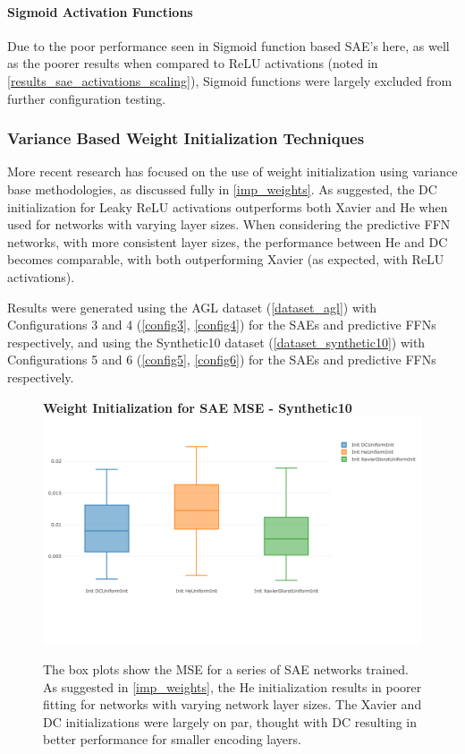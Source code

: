 \documentclass[a4paper,11pt,oneside]{article}
\theoremstyle{plain}
\theoremstyle{definition}
\begin{document}
\paragraph{Sigmoid Activation Functions} 
Due to the poor performance seen in Sigmoid function based SAE's here, as well as the poorer results when compared to ReLU activations (noted in \ref{results_sae_activations_scaling}), Sigmoid functions were largely excluded from further configuration testing.


\subsubsection{Variance Based Weight Initialization Techniques}

More recent research has focused on the use of weight initialization using variance base methodologies, as discussed fully in \ref{imp_weights}. As suggested, the DC initialization for Leaky ReLU activations outperforms both Xavier and He when used for networks with varying layer sizes. When considering the predictive FFN networks, with more consistent layer sizes, the performance between He and DC becomes comparable, with both outperforming Xavier (as expected, with ReLU activations).\newline

Results were generated using the AGL dataset (\ref{dataset_agl}) with Configurations 3 and 4 (\ref{config3}, \ref{config4}) for the SAEs and predictive FFNs respectively, and using the Synthetic10 dataset (\ref{dataset_synthetic10}) with Configurations 5 and 6 (\ref{config5}, \ref{config6}) for the  SAEs and predictive FFNs respectively.

\begin{figure}[H]
	\centering
	\textbf{Weight Initialization for SAE MSE - Synthetic10} 
	\includegraphics[scale=0.35]{images/iteration_four/it4_sae_init.png}
	\caption{
		\newline The box plots show the MSE for a series of SAE networks trained. As suggested in \ref{imp_weights}, the He initialization results in poorer fitting for networks with varying network layer sizes. The Xavier and DC initializations were largely on par, thought with DC resulting in better performance for smaller encoding layers.}
	\label{figure-results_it4_sae_init}
\end{figure}
\end{document}
